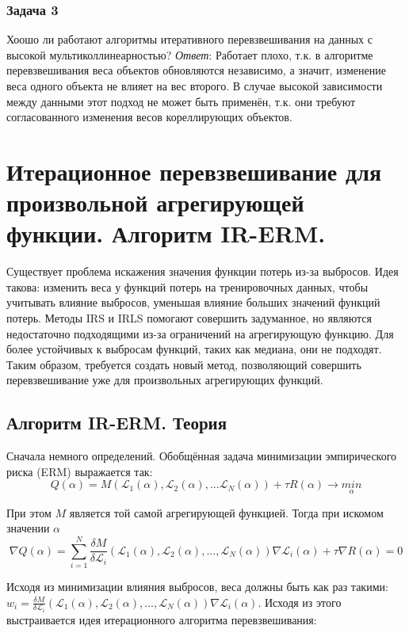 \subsubsection{Задача 3}
Хоошо ли работают алгоритмы итеративного перевзвешивания на данных с высокой
мультиколлинеарностью?
\textit{Ответ}: Работает плохо, т.к. в алгоритме перевзвешивания веса объектов
обновляются независимо, а значит, изменение веса одного объекта не влияет на
вес второго. В случае высокой зависимости между данными этот подход не может
быть применён, т.к. они требуют согласованного изменения весов кореллирующих
объектов.



\section{Итерационное перевзвешивание для произвольной агрегирующей функции. Алгоритм IR-ERM.}

Существует проблема искажения значения функции потерь из-за выбросов. Идея такова: изменить веса у функций потерь на тренировочных данных, чтобы учитывать влияние выбросов, уменьшая влияние больших значений функций потерь. Методы IRS и IRLS помогают совершить задуманное, но являются недостаточно подходящими из-за ограничений на агрегирующую функцию. Для более устойчивых к выбросам функций, таких как медиана, они не подходят. Таким образом, требуется создать новый метод, позволяющий совершить перевзвешивание уже для произвольных агрегирующих функций.

\subsection{Алгоритм IR-ERM. Теория}

Сначала немного определений. Обобщённая задача минимизации эмпирического риска (ERM) выражается так:
$$Q(\alpha) = M(\mathscr{L}_1(\alpha), \mathscr{L}_2(\alpha), ... \mathscr{L}_N(\alpha)) + \tau R(\alpha) \xrightarrow{} \underset{\alpha}{min}$$

При этом $M$ является той самой агрегирующей функцией. Тогда при искомом значении $\alpha$
$$\nabla Q(\alpha) = \sum_{i=1}^N \frac{\delta M}{\delta \mathscr{L}_i}(\mathscr{L}_1(\alpha), \mathscr{L}_2(\alpha), ..., \mathscr{L}_N(\alpha)) \nabla \mathscr{L}_i(\alpha) + \tau \nabla R(\alpha) = 0$$

Исходя из минимизации влияния выбросов, веса должны быть как раз такими: $w_i = \frac{\delta M}{\delta \mathscr{L}_i}(\mathscr{L}_1(\alpha), \mathscr{L}_2(\alpha), ..., \mathscr{L}_N(\alpha)) \nabla \mathscr{L}_i(\alpha)$. Исходя из этого выстраивается идея итерационного алгоритма перевзвешивания:

